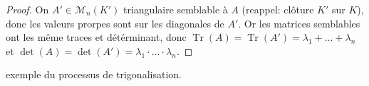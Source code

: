 \begin{proof}
    On $A' \in \mathcal{M}_n(K')$ triangulaire semblable à $A$ (reappel: clôture $K'$ sur  $K$), donc les valeurs prorpes sont sur les diagonales de $A'$. Or les matrices semblables ont les même traces et détérminant, donc $\operatorname{Tr}(A) = \operatorname{Tr}(A') = \lambda_1 + \ldots + \lambda_n$ et $\det(A) = \det(A') = \lambda_1 \cdot \ldots \cdot \lambda_n$.
\end{proof}

\begin{TODO}
   exemple du processus de trigonalisation. 
\end{TODO}
